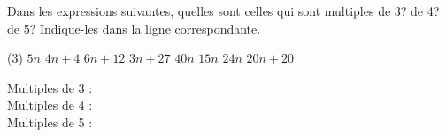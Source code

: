 %
%
Dans les expressions suivantes, quelles sont celles qui sont multiples de 3?  de 4? de 5? Indique-les dans la ligne correspondante.
    \begin{tasks} (3)
        \task $5n$
        \task $4n+4$
        \task $6n+12$
        \task $3n+27$
        \task $40n$
        \task $15n$
        \task $24n$
        \task $20n+20$
    \end{tasks}
    Multiples de 3 : \\
    Multiples de 4 : \\
    Multiples de 5 : \\

